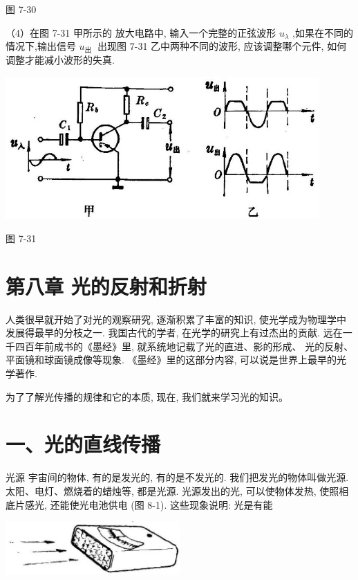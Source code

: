 \documentclass[10pt]{article}
\begin{document}
图 7-30

（4）在图 7-31 甲所示的 放大电路中, 输入一个完整的正弦波形 \({u}_{\lambda }\) ,如果在不同的情况下,输出信号 \({u}_{\text{出 }}\) 出现图 7-31 乙中两种不同的波形, 应该调整哪个元件, 如何调整才能减小波形的失真.

\begin{center}
\includegraphics[max width=0.9\textwidth]{images/01913056-1f15-74d8-9184-9aab52c9d66b_242_468958.jpg}
\end{center}

图 7-31

\section*{第八章 光的反射和折射}

人类很早就开始了对光的观察研究, 逐渐积累了丰富的知识, 使光学成为物理学中发展得最早的分枝之一. 我国古代的学者, 在光学的研究上有过杰出的贡献. 远在一千四百年前成书的《墨经》里, 就系统地记载了光的直进、影的形成、 光的反射、平面镜和球面镜成像等现象. 《墨经》里的这部分内容, 可以说是世界上最早的光学著作.

为了了解光传播的规律和它的本质, 现在, 我们就来学习光的知识。

\section*{一、光的直线传播}

光源 宇宙间的物体, 有的是发光的, 有的是不发光的. 我们把发光的物体叫做光源. 太阳、电灯、燃烧着的蜡烛等, 都是光源. 光源发出的光, 可以使物体发热, 使照相底片感光, 还能使光电池供电 (图 8-1). 这些现象说明: 光是有能

\begin{center}
\includegraphics[max width=0.5\textwidth]{images/01913056-1f15-74d8-9184-9aab52c9d66b_243_211125.jpg}
\end{center}
\end{document}
